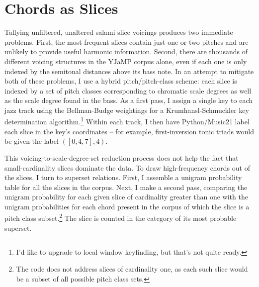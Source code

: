 \section{Chords as Slices}

Tallying unfiltered, unaltered salami slice voicings produces two immediate problems.  First, the most frequent slices contain just one or two pitches and are unlikely to provide useful harmonic information.  Second, there are thousands of different voicing structures in the YJaMP corpus alone, even if each one is only indexed by the semitonal distances above its bass note.  In an attempt to mitigate both of these problems, I use a hybrid pitch/pitch-class scheme: each slice is indexed by a set of pitch classes corresponding to chromatic scale degrees as well as the scale degree found in the bass.  As a first pass, I assign a single key to each jazz track using the Bellman-Budge weightings for a Krumhansl-Schmuckler key determination algorithm.\footnote{I'd like to upgrade to local window keyfinding, but that's not quite ready.}  Within each track, I then have Python/Music21 label each slice in the key's coordinates -- for example, first-inversion tonic triads would be given the label $([0,4,7],4)$.  

This voicing-to-scale-degree-set reduction process does not help the fact that small-cardinality slices dominate the data.  To draw high-frequency chords out of the slices, I turn to superset relations.  First, I assemble a unigram probability table for all the slices in the corpus.  Next, I make a second pass, comparing the unigram probability for each given slice of cardinality greater than one with the unigram probabilities for each chord present in the corpus of which the slice is a pitch class subset.\footnote{The code does not address slices of cardinality one, as each such slice would be a subset of all possible pitch class sets.}  The slice is counted in the category of its most probable superset.

